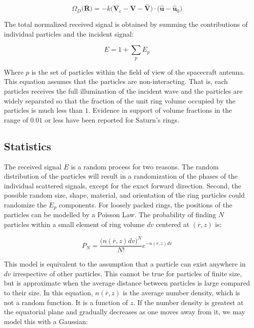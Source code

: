 \documentclass[oneside]{book}
\theoremstyle{mystyle}
\begin{document}
\begin{equation}
\Omega_{D}\big(\overline{\mathbf{R}}\big) = -k\big(\overline{\mathbf{V}_{c}} - \overline{\mathbf{V}}-\overset{\sim}{\mathbf{V}}\big)\cdot \big(\hat{\mathbf{u}} - \hat{\mathbf{u}}_{0}\big)
\end{equation}

The total normalized received signal is obtained by summing the contributions of individual particles and the incident signal:

\begin{equation}
E = 1+\sum_{p} E_{p}
\end{equation}

Where $p$ is the set of particles within the field of view of the spacecraft antenna. This equation assumes that the particles are non-interacting. That is, each particles receives the full illumination of the incident wave and the particles are widely separated so that the fraction of the unit ring volume occupied by the particles is much less than $1$. Evidence in support of volume fractions in the range of $0.01$ or less have been reported for Saturn's rings. 

\subsection{Statistics}

The received signal $E$ is a random process for two reasons. The random distribution of the particles will result in a randomization of the phases of the individual scattered signals, except for the exact forward direction. Second, the possible random size, shape, material, and orientation of the ring particles could randomize the $E_{p}$ components. For loosely packed rings, the positions of the particles can be modelled by a Poisson Law. The probability of finding $N$ particles within a small element of ring volume $dv$ centered at $(\overline{r},z)$ is:

\begin{equation}
P_{N} = \frac{\big(n(\overline{r},z)dv\big)^N}{N!}e^{-n(\overline{r},z)dv}
\end{equation}

This model is equivalent to the assumption that a particle can exist anywhere in $dv$ irrespective of other particles. This cannot be true for particles of finite size, but is approximate when the average distance between particles is large compared to their size. In this equation, $n(\overline{r},z)$ is the average number density, which is not a random function. It is a function of $z$. If the number density is greatest at the equatorial plane and gradually decreases as one moves away from it, we may model this with a Gaussian:
\end{document}
